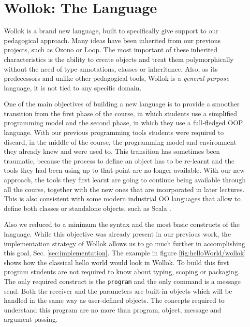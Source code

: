 \section{Wollok: The Language}
\label{sec:wollokLanguage}


Wollok is a brand new language, built to specifically give support to our pedagogical approach.
Many ideas have been inherited from our previous projects, such as Ozono or Loop. 
The most important of these inherited characteristics is the ability to create objects and treat them polymorphically without the need of type annotations, classes or inheritance.
Also, as its predecessors and unlike other pedagogical tools, Wollok is a \emph{general purpose} language, \ie it is not tied to any specific domain.

\medskip
One of the main objectives of building a new language is to provide a smoother transition from the first phase of the course,
in which students use a simplified programming model and the second phase, in which they use a full-fledged OOP language.
With our previous programming tools students were required to discard, in the middle of the course, the programming model and enviromnent they already knew and were used to.
This transition has sometimes been traumatic, because the process to define an object has to be re-learnt and the tools they had been using up to that point are no longer available.
With our new approach, the tools they first learnt are going to continue being available through all the course, together with the new ones that are incorporated in later lectures.
This is also consistent with some modern industrial OO languages that allow to define both classes or standalone objects, such as Scala \cite{Oder04a}.

\medskip
Also we reduced to a minimum the syntax and the most basic constructs of the language.
While this objective was already present in our previous work, the implementation strategy of Wollok allows us to go much further in accomplishing this goal, \cf Sec. \ref{sec:implementation}.
The example in figure \ref{fig:helloWorld/wollok} shows how the classical hello world would look in Wollok.
To build this first program students are not required to know about typing, scoping or packaging.
The only required construct is the \lstinline[language=Wollok]{program} and the only command is a message send.
Both the receiver and the parameters are built-in objects which will be handled in the same way as user-defined objects.
The concepts required to understand this program are no more than program, object, message and argument passing.


